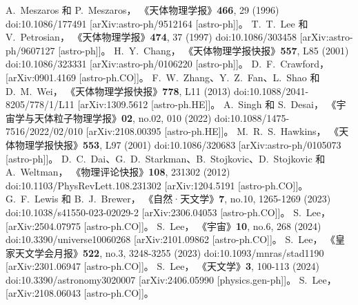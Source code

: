 \documentclass[jkps,preprint,fleqn]{revtex4}
\begin{document}
\begin{thebibliography}{999}
A.~Meszaros 和 P.~Meszaros，
《天体物理学报》\textbf{466}, 29 (1996)
doi:10.1086/177491
[arXiv:astro-ph/9512164 [astro-ph]]。
T.~T.~Lee 和 V.~Petrosian，
《天体物理学报》\textbf{474}, 37 (1997)
doi:10.1086/303458
[arXiv:astro-ph/9607127 [astro-ph]]。
H.~Y.~Chang，
《天体物理学报快报》\textbf{557}, L85 (2001)
doi:10.1086/323331
[arXiv:astro-ph/0106220 [astro-ph]]。
D.~F.~Crawford，
[arXiv:0901.4169 [astro-ph.CO]]。
F.~W.~Zhang、Y.~Z.~Fan、L.~Shao 和 D.~M.~Wei，
《天体物理学报快报》\textbf{778}, L11 (2013)
doi:10.1088/2041-8205/778/1/L11
[arXiv:1309.5612 [astro-ph.HE]]。
A.~Singh 和 S.~Desai，
《宇宙学与天体粒子物理学报》\textbf{02}, no.02, 010 (2022)
doi:10.1088/1475-7516/2022/02/010
[arXiv:2108.00395 [astro-ph.HE]]。
M.~R.~S.~Hawkins，
《天体物理学报快报》\textbf{553}, L97 (2001)
doi:10.1086/320683
[arXiv:astro-ph/0105073 [astro-ph]]。
D.~C.~Dai、G.~D.~Starkman、B.~Stojkovic、D.~Stojkovic 和 A.~Weltman，
《物理评论快报》\textbf{108}, 231302 (2012)
doi:10.1103/PhysRevLett.108.231302
[arXiv:1204.5191 [astro-ph.CO]]。
G.~F.~Lewis 和 B.~J.~Brewer，
《自然·天文学》\textbf{7}, no.10, 1265-1269 (2023)
doi:10.1038/s41550-023-02029-2
[arXiv:2306.04053 [astro-ph.CO]]。
S.~Lee，
[arXiv:2504.07975 [astro-ph.CO]]。
S.~Lee，
《宇宙》\textbf{10}, no.6, 268 (2024)
doi:10.3390/universe10060268
[arXiv:2101.09862 [astro-ph.CO]]。
S.~Lee，
《皇家天文学会月报》\textbf{522}, no.3, 3248-3255 (2023)
doi:10.1093/mnras/stad1190
[arXiv:2301.06947 [astro-ph.CO]]。
S.~Lee，
《天文学》\textbf{3}, 100-113 (2024)
doi:10.3390/astronomy3020007
[arXiv:2406.05990 [physics.gen-ph]]。
S.~Lee，
[arXiv:2108.06043 [astro-ph.CO]]。
\end{thebibliography}
\end{document}
